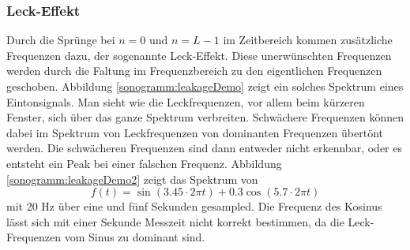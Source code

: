 \subsubsection{Leck-Effekt}
Durch die Sprünge bei $n = 0$ und $n = L-1$ im Zeitbereich kommen zusätzliche Frequenzen dazu, der sogenannte
Leck-Effekt.
Diese unerwünschten Frequenzen werden durch die Faltung im Frequenzbereich zu den eigentlichen Frequenzen 
geschoben.
Abbildung \ref{sonogramm:leakageDemo} zeigt ein solches Spektrum eines Eintonsignals.
Man sieht wie die Leckfrequenzen, vor allem beim kürzeren Fenster,
sich über das ganze Spektrum verbreiten.
Schwächere Frequenzen können dabei im Spektrum von Leckfrequenzen von dominanten Frequenzen
übertönt werden.
Die schwächeren Frequenzen sind dann entweder nicht erkennbar, oder es entsteht ein Peak 
bei einer falschen Frequenz. 
Abbildung \ref{sonogramm:leakageDemo2} zeigt das Spektrum von 
\begin{equation}
    f(t) = \sin(3.45\cdot 2\pi t) + 0.3  \cos(5.7\cdot  2\pi t)
\label{sonogramm:eq:sigLeck}
\end{equation}
mit 20 Hz über eine und fünf Sekunden gesampled.
Die Frequenz des Kosinus lässt sich mit einer Sekunde Messzeit nicht korrekt bestimmen, 
da die Leck-Frequenzen vom Sinus zu dominant sind.

